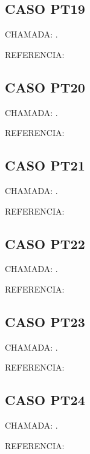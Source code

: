 \documentclass{undftex}
\begin{document}
\begin{refsection}\section*{CASO PT19} CHAMADA: . \textcite{pt19}\par REFERENCIA:\par\printbibliography[heading=none,check=undfconsultadas]\end{refsection}\clearpage
\begin{refsection}\section*{CASO PT20} CHAMADA: . \textcite{pt20}\par REFERENCIA:\par\printbibliography[heading=none,check=undfconsultadas]\end{refsection}\clearpage
\begin{refsection}\section*{CASO PT21} CHAMADA: . \textcite{pt21}\par REFERENCIA:\par\printbibliography[heading=none,check=undfconsultadas]\end{refsection}\clearpage
\begin{refsection}\section*{CASO PT22} CHAMADA: . \textcite{pt22}\par REFERENCIA:\par\printbibliography[heading=none,check=undfconsultadas]\end{refsection}\clearpage
\begin{refsection}\section*{CASO PT23} CHAMADA: . \textcite{pt23}\par REFERENCIA:\par\printbibliography[heading=none,check=undfconsultadas]\end{refsection}\clearpage
\begin{refsection}\section*{CASO PT24} CHAMADA: . \textcite{pt24}\par REFERENCIA:\par\printbibliography[heading=none,check=undfconsultadas]\end{refsection}\clearpage
\end{document}
